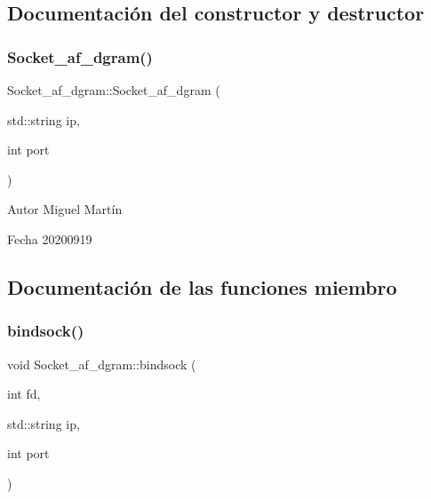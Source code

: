 \subsection{Documentación del constructor y destructor}
\mbox{\label{classSocket__af__dgram_a11391f68bb56dafa6be879f388e4b0cd}} 
\subsubsection{\texorpdfstring{Socket\+\_\+af\+\_\+dgram()}{Socket\_af\_dgram()}}
{\footnotesize\ttfamily Socket\+\_\+af\+\_\+dgram\+::\+Socket\+\_\+af\+\_\+dgram (\begin{DoxyParamCaption}\item[{std\+::string}]{ip,  }\item[{int}]{port }\end{DoxyParamCaption})}

\begin{DoxyAuthor}{Autor}
Miguel Martín 
\end{DoxyAuthor}
\begin{DoxyDate}{Fecha}
20200919 
\end{DoxyDate}


\subsection{Documentación de las funciones miembro}
\mbox{\label{classSocket__af__dgram_a6a2084d50ab117b0bf6b699aa0573db5}} 
\subsubsection{\texorpdfstring{bindsock()}{bindsock()}}
{\footnotesize\ttfamily void Socket\+\_\+af\+\_\+dgram\+::bindsock (\begin{DoxyParamCaption}\item[{int}]{fd,  }\item[{std\+::string}]{ip,  }\item[{int}]{port }\end{DoxyParamCaption})}



